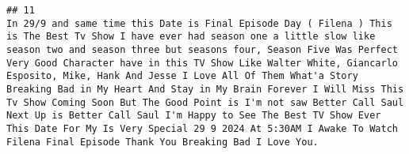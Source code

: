\documentclass[
]{article}
\begin{document}
\begin{verbatim}
## 11                                                                                                                                                                                                                                                                                                                                                                                                                                                                                                                                                                                                                                                                                                                                                                                                                                                                                                                                                                                                                                                                                                                                                                                                                                                                                                                                                                                                                                                                                                                 In 29/9 and same time this Date is Final Episode Day ( Filena ) This is The Best Tv Show I have ever had season one a little slow like season two and season three but seasons four, Season Five Was Perfect Very Good Character have in this TV Show Like Walter White, Giancarlo Esposito, Mike, Hank And Jesse I Love All Of Them What'a Story Breaking Bad in My Heart And Stay in My Brain Forever I Will Miss This Tv Show Coming Soon But The Good Point is I'm not saw Better Call Saul Next Up is Better Call Saul I'm Happy to See The Best TV Show Ever This Date For My Is Very Special 29 9 2024 At 5:30AM I Awake To Watch Filena Final Episode Thank You Breaking Bad I Love You.

\end{verbatim}
\end{document}
